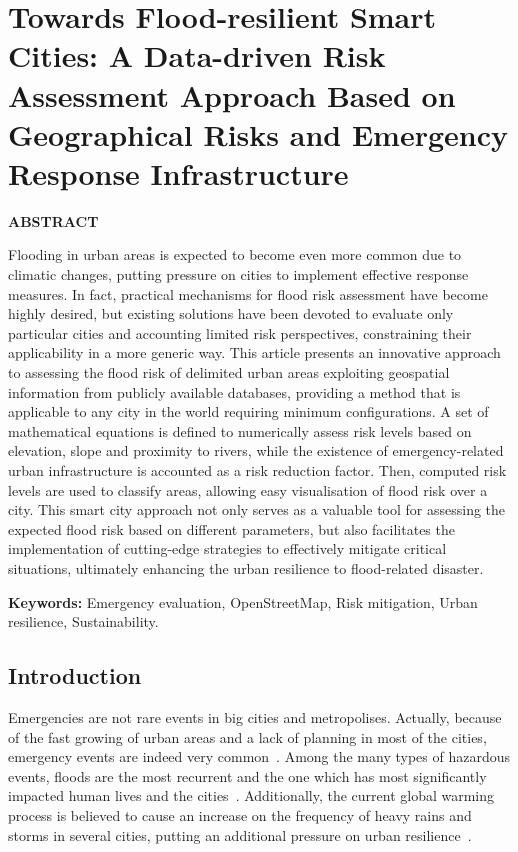 \chapter{Towards Flood-resilient Smart Cities: A Data-driven Risk Assessment Approach Based on Geographical Risks and Emergency Response Infrastructure}\label{cap:flood}

\begin{refsection}

\textbf{ABSTRACT}

Flooding in urban areas is expected to become even more common due to climatic changes, putting pressure on cities to implement effective response measures. In fact, practical mechanisms for flood risk assessment have become highly desired, but existing solutions have been devoted to evaluate only particular cities and accounting limited risk perspectives, constraining their applicability in a more generic way. This article presents an innovative approach to assessing the flood risk of delimited urban areas exploiting geospatial information from publicly available databases, providing a method that is applicable to any city in the world requiring minimum configurations. A set of mathematical equations is defined to numerically assess risk levels based on elevation, slope and proximity to rivers, while the existence of emergency-related urban infrastructure is accounted as a risk reduction factor. Then, computed risk levels are used to classify areas, allowing easy visualisation of flood risk over a city. This smart city approach not only serves as a valuable tool for assessing the expected flood risk based on different parameters, but also facilitates the implementation of cutting-edge strategies to effectively mitigate critical situations, ultimately enhancing the urban resilience to flood-related disaster.

\textbf{Keywords:} Emergency evaluation, OpenStreetMap, Risk mitigation, Urban resilience, Sustainability.

\section{Introduction}

Emergencies are not rare events in big cities and metropolises. Actually, because of the fast growing of urban areas and a lack of planning in most of the cities, emergency events are indeed very common~\cite{emergency1,emergency2}. Among the many types of hazardous events, floods are the most recurrent and the one which has most significantly impacted human lives and the cities~\cite{flood,flood2}. Additionally, the current global warming process is believed to cause an increase on the frequency of heavy rains and storms in several cities, putting an additional pressure on urban resilience~\cite{warming,warming_bangladesh}.


\end{refsection}
